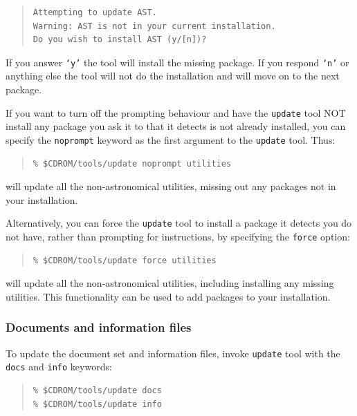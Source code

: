 \documentclass[twoside,11pt]{article}
\newcommand{\xlabel}[1]{}
\renewcommand{\_}{\texttt{\symbol{95}}}
\begin{document}
\begin{quote}
\begin{verbatim}
Attempting to update AST.
Warning: AST is not in your current installation.
Do you wish to install AST (y/[n])?
\end{verbatim}
\end{quote}

If you answer \texttt{`y'} the tool will install the missing package.
If you respond \texttt{`n'} or anything else the tool will not do the
installation and will move on to the next package.

If you want to turn off the prompting behaviour and have the
\texttt{update} tool NOT install any package you ask it to that it
detects is not already installed, you can specify the \texttt{noprompt}
keyword as the first argument to the \texttt{update} tool.  Thus:

\begin{quote}
\begin{verbatim}
% $CDROM/tools/update noprompt utilities
\end{verbatim}
\end{quote}

will update all the non-astronomical utilities, missing out any 
packages not in your installation. 

Alternatively, you can force the \texttt{update} tool to install a
package it detects you do not have, rather than prompting for
instructions, by specifying the \texttt{force} option:

\begin{quote}
\begin{verbatim}
% $CDROM/tools/update force utilities
\end{verbatim}
\end{quote}

will update all the non-astronomical utilities, including installing
any missing utilities.  This functionality can be used to add packages
to your installation.

\subsubsection{\xlabel{documents_and_information_files}Documents and information files}
\label{documents_and_information_files}

To update the document set and information files, invoke \texttt{update} tool
with the \texttt{docs} and \texttt{info} keywords:

\begin{quote}
\begin{verbatim}
% $CDROM/tools/update docs
% $CDROM/tools/update info
\end{verbatim}
\end{quote}
\end{document}
